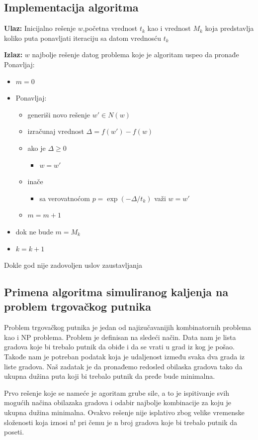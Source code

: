 \documentclass[a4paper]{article}
\begin{document}
\subsection{Implementacija algoritma}
\textbf{Ulaz:} \hspace{0.1cm} Inicijalno rešenje $w$,početna vrednost $t_k$ kao i vrednost $M_k$ koja predstavlja koliko puta ponavljati iteraciju sa datom vrednosću $t_k$
 \par
\textbf{Izlaz:}\hspace{0.1cm} $w$ najbolje rešenje datog problema koje je algoritam uspeo da pronađe
\newline
Ponavljaj:
\begin{itemize}
\item[] $m=0$
\item[]  Ponavljaj:
\begin{itemize}
\item[] generiši novo rešenje  $w'\in N(w)$
\item[] izračunaj vrednost  $\Delta=f(w')-f(w)$
\item[] ako je $\Delta \geq 0$
\begin{itemize}
\item[] $w=w'$ 
\end{itemize}
\item[]inače
\begin{itemize}
\item[] sa verovatnoćom $p=\exp(-\Delta/t_k)$ važi $w=w'$ 
\end{itemize}
\item[]$m=m+1$
\end{itemize}
\item[]dok ne bude $ m=M_k$
\item[] $k=k+1$
\end{itemize}
Dokle god nije zadovoljen uslov zaustavljanja


\subsection{Primena algoritma simuliranog kaljenja\cite{sannealing_tsp_application} na problem trgovačkog putnika}


  Problem trgovačkog putnika je jedan od najizučavanijih kombinatornih problema kao i NP problema. Problem je definisan na sledeći način.
  Data nam je lista gradova koje bi trebalo putnik da obiđe i da se vrati u grad iz kog je pošao. Takođe nam je potreban podatak koja je udaljenost između svaka dva grada iz liste gradova. Naš zadatak je da pronađemo redosled obilaska gradova tako da ukupna dužina puta koji bi trebalo putnik da pređe bude minimalna.\par
  Prvo rešenje koje se nameće je agoritam grube sile, a to je ispitivanje svih mogućih načina obilazaka gradova i odabir najbolje kombinacije za koju je ukupna dužina minimalna. Ovakvo rešenje nije isplativo zbog velike vremenske složenosti koja iznosi n! pri čemu je n broj gradova koje bi trebalo putnik da poseti.\par
    
\end{document}

